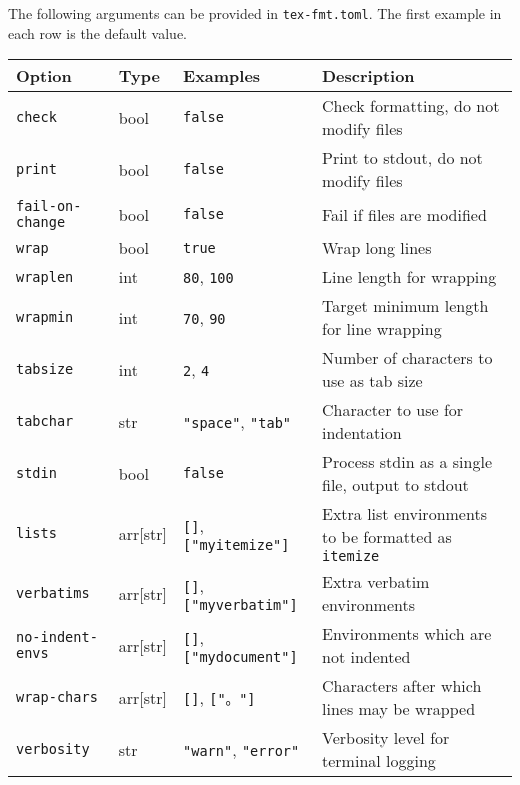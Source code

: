\documentclass{scrartcl}
\begin{document}
The following arguments can be provided in \texttt{tex-fmt.toml}.
The first example in each row is the default value.

\begin{longtable}{|l|l|l|l|}
\hline
Option & Type & Examples & Description\\
\hline
\texttt{check} & bool & \texttt{false} & Check formatting, do not modify files\\
\texttt{print} & bool & \texttt{false} & Print to stdout, do not modify files\\
\texttt{fail-on-change} & bool & \texttt{false} & Fail if files are modified\\
\texttt{wrap} & bool & \texttt{true} & Wrap long lines\\
\texttt{wraplen} & int & \texttt{80}, \texttt{100} & Line length for wrapping\\
\texttt{wrapmin} & int & \texttt{70}, \texttt{90} & Target minimum length for line wrapping\\
\texttt{tabsize} & int & \texttt{2}, \texttt{4} & Number of characters to use as tab size\\
\texttt{tabchar} & str & \texttt{"space"}, \texttt{"tab"} & Character to use for indentation\\
\texttt{stdin} & bool & \texttt{false} & Process stdin as a single file, output to stdout\\
\texttt{lists} & arr{[}str{]} & \texttt{{[}{]}}, \texttt{{[}"myitemize"{]}} & Extra list environments to be formatted as \texttt{itemize}\\
\texttt{verbatims} & arr{[}str{]} & \texttt{{[}{]}}, \texttt{{[}"myverbatim"{]}} & Extra verbatim environments\\
\texttt{no-indent-envs} & arr{[}str{]} & \texttt{{[}{]}}, \texttt{{[}"mydocument"{]}} & Environments which are not indented\\
\texttt{wrap-chars} & arr{[}str{]} & \texttt{{[}{]}}, \texttt{{[}"。"{]}} & Characters after which lines may be wrapped\\
\texttt{verbosity} & str & \texttt{"warn"}, \texttt{"error"} & Verbosity level for terminal logging\\
\hline
\end{longtable}
\end{document}
